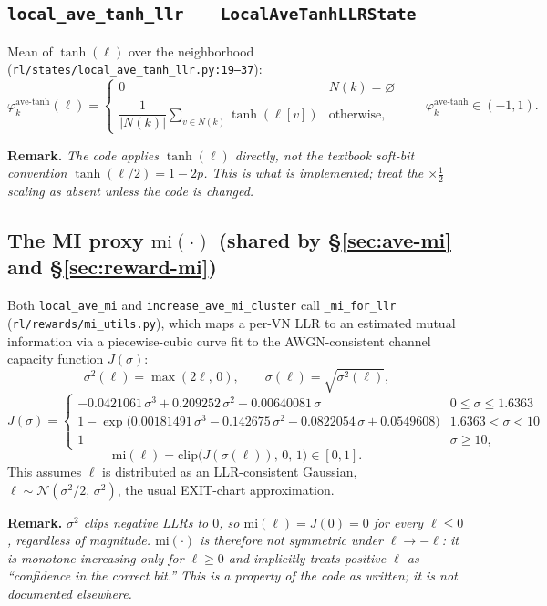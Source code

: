 \documentclass[11pt]{article}
\newcommand{\code}[1]{\texttt{#1}}
\newcommand{\file}[1]{\texttt{#1}}
\newenvironment{remark}
  {\par\medskip\noindent\textbf{Remark.}\itshape}
  {\par\medskip}
\begin{document}
\subsection{\code{local\_ave\_tanh\_llr} --- \code{LocalAveTanhLLRState}}
Mean of $\tanh(\ell)$ over the neighborhood
(\file{rl/states/local\_ave\_tanh\_llr.py:19--37}):
\[
\varphi_k^{\mathrm{ave\text{-}tanh}}(\ell) =
\begin{cases}
0 & N(k) = \varnothing \\[2pt]
\dfrac{1}{|N(k)|}\displaystyle\sum_{v\in N(k)} \tanh(\ell[v]) & \text{otherwise,}
\end{cases}
\qquad \varphi_k^{\mathrm{ave\text{-}tanh}}\in(-1,1).
\]

\begin{remark}
The code applies $\tanh(\ell)$ directly, \emph{not} the textbook soft-bit convention
$\tanh(\ell/2) = 1-2p$. This is what is implemented; treat the $\times\tfrac12$ scaling
as absent unless the code is changed.
\end{remark}

\subsection{The MI proxy $\mathrm{mi}(\cdot)$ (shared by \S\ref{sec:ave-mi} and \S\ref{sec:reward-mi})}
\label{sec:mi-fn}
Both \code{local\_ave\_mi} and \code{increase\_ave\_mi\_cluster} call
\code{\_mi\_for\_llr} (\file{rl/rewards/mi\_utils.py}), which maps a per-VN LLR to an
estimated mutual information via a piecewise-cubic curve fit to the AWGN-consistent
channel capacity function $J(\sigma)$:
\[
\sigma^2(\ell) = \max(2\ell,\,0), \qquad \sigma(\ell) = \sqrt{\sigma^2(\ell)},
\]
\[
J(\sigma) =
\begin{cases}
-0.0421061\,\sigma^3 + 0.209252\,\sigma^2 - 0.00640081\,\sigma & 0 \le \sigma \le 1.6363 \\[4pt]
1 - \exp\!\big(0.00181491\,\sigma^3 - 0.142675\,\sigma^2 - 0.0822054\,\sigma + 0.0549608\big) & 1.6363 < \sigma < 10 \\[4pt]
1 & \sigma \ge 10,
\end{cases}
\]
\[
\mathrm{mi}(\ell) = \mathrm{clip}\big(J(\sigma(\ell)),\, 0,\, 1\big) \in [0,1].
\]
This assumes $\ell$ is distributed as an LLR-consistent Gaussian,
$\ell \sim \mathcal{N}(\sigma^2/2,\,\sigma^2)$, the usual EXIT-chart approximation.

\begin{remark}
$\sigma^2$ clips negative LLRs to $0$, so $\mathrm{mi}(\ell) = J(0) = 0$ for
\emph{every} $\ell \le 0$, regardless of magnitude. $\mathrm{mi}(\cdot)$ is therefore not
symmetric under $\ell \to -\ell$: it is monotone increasing only for $\ell \ge 0$ and
implicitly treats positive $\ell$ as ``confidence in the correct bit.'' This is a
property of the code as written; it is not documented elsewhere.
\end{remark}
\end{document}
